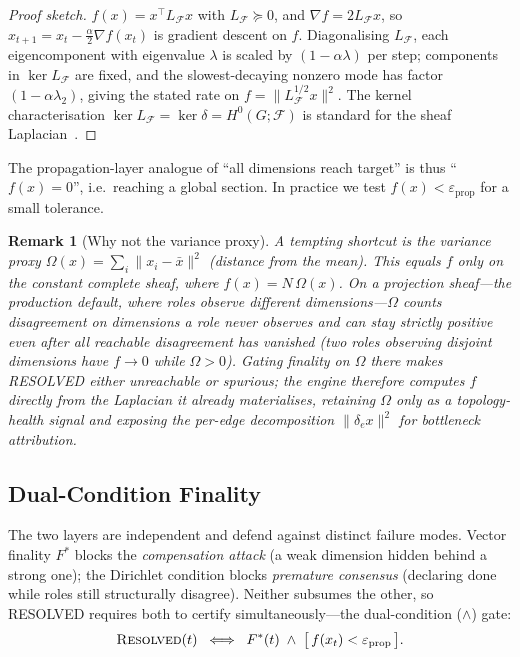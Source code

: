 \documentclass[11pt]{article}
\newtheorem{remark}{Remark}
\begin{document}
\begin{proof}[Proof sketch]
$f(x) = x^\top L_{\mathcal{F}} x$ with $L_{\mathcal{F}} \succeq 0$, and $\nabla f = 2 L_{\mathcal{F}} x$, so $x_{t+1} = x_t - \tfrac{\alpha}{2}\nabla f(x_t)$ is gradient descent on $f$. Diagonalising $L_{\mathcal{F}}$, each eigencomponent with eigenvalue $\lambda$ is scaled by $(1-\alpha\lambda)$ per step; components in $\ker L_{\mathcal{F}}$ are fixed, and the slowest-decaying nonzero mode has factor $(1-\alpha\lambda_2)$, giving the stated rate on $f = \|L_{\mathcal{F}}^{1/2} x\|^2$. The kernel characterisation $\ker L_{\mathcal{F}} = \ker \delta = H^0(G;\mathcal{F})$ is standard for the sheaf Laplacian~\cite{ghrist2022}.
\end{proof}

The propagation-layer analogue of ``all dimensions reach target'' is thus ``$f(x) = 0$'', i.e.\ reaching a global section. In practice we test $f(x) < \varepsilon_{\mathrm{prop}}$ for a small tolerance.

\begin{remark}[Why not the variance proxy]
\label{rem:omega-proxy}
A tempting shortcut is the variance proxy $\Omega(x) = \sum_i \|x_i - \bar{x}\|^2$ (distance from the mean). This equals $f$ only on the constant complete sheaf, where $f(x) = N\,\Omega(x)$. On a \emph{projection} sheaf---the production default, where roles observe different dimensions---$\Omega$ counts disagreement on dimensions a role never observes and can stay strictly positive even after all \emph{reachable} disagreement has vanished (two roles observing disjoint dimensions have $f \to 0$ while $\Omega > 0$). Gating finality on $\Omega$ there makes RESOLVED either unreachable or spurious; the engine therefore computes $f$ directly from the Laplacian it already materialises, retaining $\Omega$ only as a topology-health signal and exposing the per-edge decomposition $\|\delta_e x\|^2$ for bottleneck attribution.
\end{remark}

\subsection{Dual-Condition Finality}
\label{sec:dual-condition}

The two layers are independent and defend against distinct failure modes. Vector finality $F^*$ blocks the \emph{compensation attack} (a weak dimension hidden behind a strong one); the Dirichlet condition blocks \emph{premature consensus} (declaring done while roles still structurally disagree). Neither subsumes the other, so RESOLVED requires both to certify simultaneously---the dual-condition ($\wedge$) gate:
\[
\textsc{Resolved}(t) \;\iff\; F^*(t) \;\wedge\; \bigl[\, f(x_t) < \varepsilon_{\mathrm{prop}} \,\bigr].
\]
\end{document}

